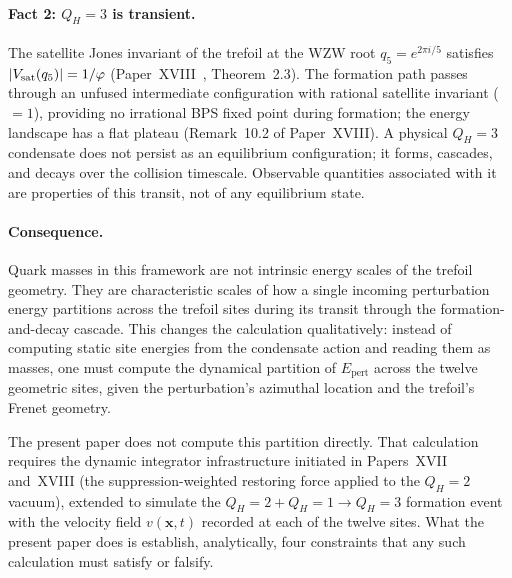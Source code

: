 \documentclass[11pt,a4paper]{article}
\theoremstyle{definition}\newtheorem{definition}[theorem]{Definition}
\theoremstyle{remark}
\newcommand{\vp}{\varphi}
\newcommand{\QH}{Q_H}
\newcommand{\Jones}{V}
\begin{document}
\paragraph{Fact 2: $\QH=3$ is transient.}  The satellite Jones
invariant of the trefoil at the WZW root $q_5=e^{2\pi i/5}$
satisfies $|\Jones_{\rm sat}(q_5)|=1/\vp$
(Paper~XVIII~\cite{Paper18}, Theorem~2.3). %
The formation path passes through an unfused intermediate
configuration with rational satellite invariant ($=1$), providing
no irrational BPS fixed point during formation; the energy
landscape has a flat plateau (Remark~10.2 of Paper~XVIII). %
A physical $\QH=3$ condensate does not persist as an equilibrium
configuration; it forms, cascades, and decays over the collision
timescale.  Observable quantities associated with it are properties
of this transit, not of any equilibrium state.

\paragraph{Consequence.}  Quark masses in this framework are not
intrinsic energy scales of the trefoil geometry.  They are
characteristic scales of how a single incoming perturbation energy
partitions across the trefoil sites during its transit through the
formation-and-decay cascade.  This changes the calculation
qualitatively: instead of computing static site energies from the
condensate action and reading them as masses, one must compute the
dynamical partition of $E_{\mathrm{pert}}$ across the twelve
geometric sites, given the perturbation's azimuthal location and
the trefoil's Frenet geometry.

The present paper does not compute this partition directly.  That
calculation requires the dynamic integrator infrastructure
initiated in Papers~XVII and~XVIII (the suppression-weighted
restoring force applied to the $\QH=2$ vacuum), extended to
simulate the $\QH=2+\QH=1\to\QH=3$ formation event with the
velocity field $v(\mathbf{x},t)$ recorded at each of the twelve
sites.  What the present paper does is establish, analytically,
four constraints that any such calculation must satisfy or
falsify.
\end{document}
